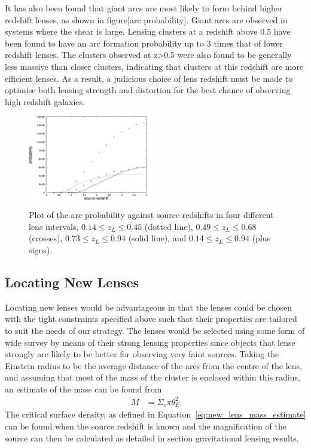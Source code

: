 		It has also been found that giant arcs are most likely to form behind higher redshift lenses, as shown in figure[arc probability]. Giant arcs are observed in systems where the shear is large. Lensing clusters at a redshift above 0.5 have been found to have an arc formation probability up to 3 times that of lower redshift lenses. The clusters observed at z>0.5 were also found to be generally less massive than closer clusters, indicating that clusters at this redshift are more efficient lenses. As a result, a judicious choice of lens redshift must be made to optimise both lensing strength and distortion for the best chance of observing high redshift galaxies. \cite{ wu_and_chiueh }
		\begin{figure}[!htbp]
			\centering
				\includegraphics[width=0.5\textwidth]{../Images/Arc_probability.png}
			\caption[Arc probability]{\cite{wu_and_chiueh}Plot of the arc probability against source redshifts in four different lens intervals, $0.14\le z_L\le 0.45$ (dotted line), $0.49\le z_L\le 0.68$ (crosses), $0.73\le z_L\le 0.94$ (solid line), and $0.14\le z_L\le 0.94$ (plus signs).\label{fig:shear_as_a_function_of_source_redshift}}
		\end{figure}

	\subsection{Locating New Lenses} %
	\label{sub:locating_new_lenses}
		Locating new lenses would be advantageous in that the lenses could be chosen with the tight constraints specified above such that their properties are tailored to suit the needs of our strategy. The lenses would be selected using some form of wide survey by means of their strong lensing properties since objects that lense strongly are likely to be better for observing very faint sources. Taking the Einstein radius to be the average distance of the arcs from the centre of the lens, and assuming that most of the mass of the cluster is enclosed within this radius, an estimate of the mass can be found from
		\begin{align}
			M &= \Sigma_c\pi \theta_E^2 \label{eq:new_lens_mass_estimate}
		\end{align}
		The critical surface density, as defined in Equation~\ref{eq:new_lens_mass_estimate} can be found when the source redshift is known and the magnification of the source can then be calculated as detailed in section gravitational lensing results.

